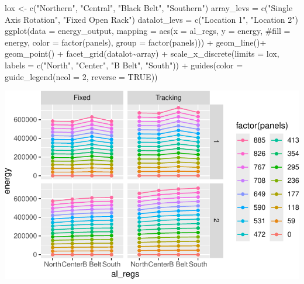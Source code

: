 \documentclass[
  letterpaper,
  DIV=11,
  numbers=noendperiod]{scrartcl}
\newenvironment{Shaded}{\begin{snugshade}}{\end{snugshade}}
\newcommand{\AttributeTok}[1]{\textcolor[rgb]{0.40,0.45,0.13}{#1}}
\newcommand{\CommentTok}[1]{\textcolor[rgb]{0.37,0.37,0.37}{#1}}
\newcommand{\ConstantTok}[1]{\textcolor[rgb]{0.56,0.35,0.01}{#1}}
\newcommand{\DecValTok}[1]{\textcolor[rgb]{0.68,0.00,0.00}{#1}}
\newcommand{\FunctionTok}[1]{\textcolor[rgb]{0.28,0.35,0.67}{#1}}
\newcommand{\NormalTok}[1]{\textcolor[rgb]{0.00,0.23,0.31}{#1}}
\newcommand{\OtherTok}[1]{\textcolor[rgb]{0.00,0.23,0.31}{#1}}
\newcommand{\SpecialCharTok}[1]{\textcolor[rgb]{0.37,0.37,0.37}{#1}}
\newcommand{\StringTok}[1]{\textcolor[rgb]{0.13,0.47,0.30}{#1}}
\begin{document}
\begin{Shaded}
\begin{Highlighting}[]
\NormalTok{lox }\OtherTok{\textless{}{-}} \FunctionTok{c}\NormalTok{(}\StringTok{"Northern"}\NormalTok{, }\StringTok{"Central"}\NormalTok{, }\StringTok{"Black Belt"}\NormalTok{, }\StringTok{"Southern"}\NormalTok{)}
\NormalTok{array\_levs }\OtherTok{=} \FunctionTok{c}\NormalTok{(}\StringTok{"Single Axis Rotation"}\NormalTok{, }\StringTok{"Fixed Open Rack"}\NormalTok{)}
\NormalTok{datalot\_levs }\OtherTok{=} \FunctionTok{c}\NormalTok{(}\StringTok{"Location 1"}\NormalTok{, }\StringTok{"Location 2"}\NormalTok{)}
\FunctionTok{ggplot}\NormalTok{(}\AttributeTok{data =}\NormalTok{ energy\_output,}
         \AttributeTok{mapping =} \FunctionTok{aes}\NormalTok{(}\AttributeTok{x =}\NormalTok{ al\_regs,}
                       \AttributeTok{y =}\NormalTok{ energy,}
                       \CommentTok{\#fill = energy,}
                       \AttributeTok{color =} \FunctionTok{factor}\NormalTok{(panels),}
                       \AttributeTok{group =} \FunctionTok{factor}\NormalTok{(panels))) }\SpecialCharTok{+}
  \FunctionTok{geom\_line}\NormalTok{()}\SpecialCharTok{+}
  \FunctionTok{geom\_point}\NormalTok{() }\SpecialCharTok{+}
  \FunctionTok{facet\_grid}\NormalTok{(datalot}\SpecialCharTok{\textasciitilde{}}\NormalTok{array) }\SpecialCharTok{+}
  \FunctionTok{scale\_x\_discrete}\NormalTok{(}\AttributeTok{limits =}\NormalTok{ lox,}
                   \AttributeTok{labels =} \FunctionTok{c}\NormalTok{(}\StringTok{"North"}\NormalTok{, }\StringTok{"Center"}\NormalTok{, }\StringTok{"B Belt"}\NormalTok{, }\StringTok{"South"}\NormalTok{)) }\SpecialCharTok{+}
  \FunctionTok{guides}\NormalTok{(}\AttributeTok{color =} \FunctionTok{guide\_legend}\NormalTok{(}\AttributeTok{ncol =} \DecValTok{2}\NormalTok{, }\AttributeTok{reverse =} \ConstantTok{TRUE}\NormalTok{))}
\end{Highlighting}
\end{Shaded}

\includegraphics{Simulation_files/figure-pdf/unnamed-chunk-16-1.pdf}
\end{document}
